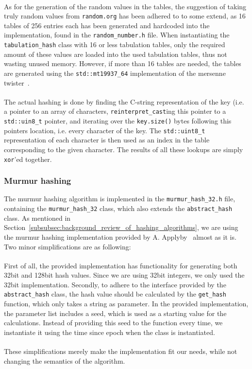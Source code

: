 \documentclass[11pt]{article} %
\begin{document}
\\
As for the generation of the random values in the tables, the suggestion of taking truly random values from \verb|random.org| has been adhered to to some extend, as 16 tables of 256 entries each has been generated and hardcoded into the implementation, found in the \verb|random_number.h| file. When instantiating the \verb|tabulation_hash| class with 16 or less tabulation tables, only the required amount of these values are loaded into the used tabulation tables, thus not wasting unused memory. However, if more than 16 tables are needed, the tables are generated using the \verb|std::mt19937_64| implementation of the mersenne twister~\cite{MT02}.\\
\\
The actual hashing is done by finding the C-string representation of the key (i.e. a pointer to an array of characters, \verb|reinterpret_cast|ing this pointer to a \verb|std::uin8_t| pointer, and iterating over the \verb|key.size()| bytes following this pointers location, i.e. every character of the key. The \verb|std::uint8_t| representation of each character is then used as an index in the table corresponding to the given character. The results of all these lookups are simply \verb|xor|'ed together.

\subsubsection{Murmur hashing}
\label{subsubsec:implementation_murmur_hash}
The murmur hashing algorithm is implemented in the \verb|murmur_hash_32.h| file, containing the \verb|murmur_hash_32| class, which also extends the \verb|abstract_hash| class. As mentioned in Section~\ref{subsubsec:background_review_of_hashing_algorithms}, we are using the murmur hashing implementation provided by A. Applyby~\cite{Mur3} almost as it is. Two minor simplifications are as following:\\
\\
First of all, the provided implementation has functionality for generating both 32bit and 128bit hash values. Since we are using 32bit integers, we only used the 32bit implementation. Secondly, to adhere to the interface provided by the \verb|abstract_hash| class, the hash value should be calculated by the \verb|get_hash| function, which only takes a string as parameter. In the provided implementation, the parameter list includes a seed, which is used as a starting value for the calculations. Instead of providing this seed to the function every time, we instantiate it using the time since epoch when the class is instantiated. \\
\\
These simplifications merely make the implementation fit our needs, while not changing the semantics of the algorithm.
\end{document}
